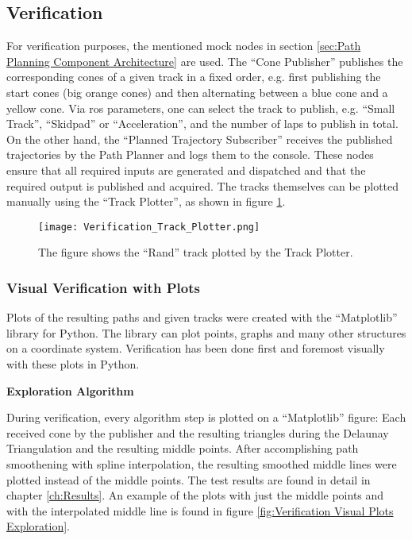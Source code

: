 \subsection{Verification} \label{sec:Verification}
For verification purposes, the mentioned mock nodes in section \ref{sec:Path Planning Component Architecture} are used. The ``Cone Publisher'' publishes the corresponding cones of a given track in a fixed order, e.g. first publishing the start cones (big orange cones) and then alternating between a blue cone and a yellow cone. Via \acrshort{ros} parameters, one can select the track to publish, e.g. ``Small Track'', ``Skidpad'' or ``Acceleration'', and the number of laps to publish in total. On the other hand, the ``Planned Trajectory Subscriber'' receives the published trajectories by the Path Planner and logs them to the console. These nodes ensure that all required inputs are generated and dispatched and that the required output is published and acquired. The tracks themselves can be plotted manually using the ``Track Plotter'', as shown in figure \ref{fig:Verification Track Plotter}.
\begin{figure}[H]
    \centering
    \texttt{[image: Verification\_Track\_Plotter.png]}
    \caption{The figure shows the ``Rand'' track plotted by the Track Plotter.}
    \label{fig:Verification Track Plotter}
\end{figure}

\subsubsection{Visual Verification with Plots} \label{sec:Visual Verification with Plots}
Plots of the resulting paths and given tracks were created with the ``Matplotlib'' library for Python. The library can plot points, graphs and many other structures on a coordinate system. Verification has been done first and foremost visually with these plots in Python.

\textbf{Exploration Algorithm}

During verification, every algorithm step is plotted on a ``Matplotlib'' figure: Each received cone by the publisher and the resulting triangles during the Delaunay Triangulation and the resulting middle points. After accomplishing path smoothening with spline interpolation, the resulting smoothed middle lines were plotted instead of the middle points. The test results are found in detail in chapter \ref{ch:Results}. An example of the plots with just the middle points and with the interpolated middle line is found in figure \ref{fig:Verification Visual Plots Exploration}.

